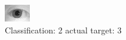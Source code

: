 \begin{figure}[h!]
\begin{center}
\includegraphics[width=0.60\columnwidth]{figures/ID1062_class_2_target_3.png}
\end{center}
\caption{ Classification: 2 actual target: 3}
\label{fig:ID1062_class_2_target_3}
\end{figure}
